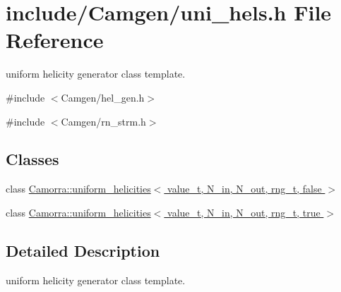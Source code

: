 \hypertarget{a00607}{
\section{include/Camgen/uni\_\-hels.h File Reference}
\label{a00607}
}


uniform helicity generator class template.  


{\ttfamily \#include $<$Camgen/hel\_\-gen.h$>$}\par
{\ttfamily \#include $<$Camgen/rn\_\-strm.h$>$}\par
\subsection*{Classes}
\begin{DoxyCompactItemize}
\item 
class \hyperlink{a00502}{Camorra::uniform\_\-helicities$<$ value\_\-t, N\_\-in, N\_\-out, rng\_\-t, false $>$}
\item 
class \hyperlink{a00503}{Camorra::uniform\_\-helicities$<$ value\_\-t, N\_\-in, N\_\-out, rng\_\-t, true $>$}
\end{DoxyCompactItemize}


\subsection{Detailed Description}
uniform helicity generator class template. 